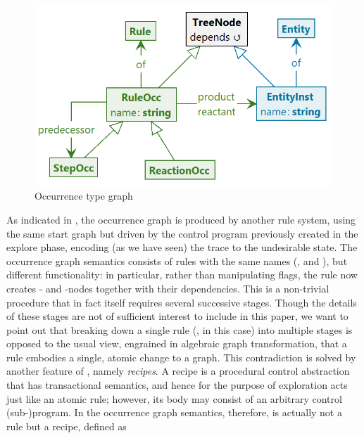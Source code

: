 \begin{figure}
\centering
\includegraphics[scale=.2]{figs/occur-type}
\caption{Occurrence type graph}
\label{fig:occur-type}
\end{figure}

As indicated in , the occurrence graph is produced by another \GROOVE rule system, using the same start graph but driven by the control program previously created in the explore phase, encoding (as we have seen) the trace to the undesirable state. The occurrence graph semantics consists of rules with the same names (\reactR, \contextR and \firedR), but different functionality: in particular, rather than manipulating \present flags, the \reactR rule now creates \RuleOcc- and \EntityInst-nodes together with their dependencies. This is a non-trivial procedure that in fact itself requires several successive stages. Though the details of these stages are not of sufficient interest to include in this paper, we want to point out that breaking down a single rule (\reactR, in this case) into multiple stages is opposed to the usual view, engrained in algebraic graph transformation, that a rule embodies a single, atomic change to a graph. This contradiction is solved by another feature of \GROOVE, namely \emph{recipes}. A recipe is a procedural control abstraction that has transactional semantics, and hence for the purpose of exploration acts just like an atomic rule; however, its body may consist of an arbitrary control (sub-)program. In the occurrence graph semantics, therefore, \reactR is actually not a rule but a recipe, defined as

